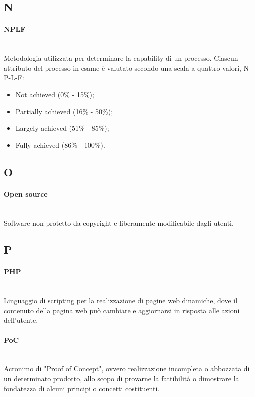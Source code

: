 \subsection*{N}
\paragraph{NPLF}~\smallskip \\
Metodologia utilizzata per determinare la capability di un processo. Ciascun attributo del processo in esame è valutato secondo una scala a quattro valori, N-P-L-F:
\begin{itemize}
	\item Not achieved (0\% - 15\%);
	\item Partially achieved (16\% - 50\%);
	\item Largely achieved (51\% - 85\%);
    \item Fully achieved (86\% - 100\%).
\end{itemize}
\newpage
{}
\subsection*{O}
\paragraph{Open source}~\smallskip \\
Software non protetto da copyright e liberamente modificabile dagli utenti.
\newpage
{}
\subsection*{P}
\paragraph{PHP}~\smallskip \\
Linguaggio di scripting per la realizzazione di pagine web dinamiche, dove il contenuto della pagina web può cambiare e aggiornarsi in risposta alle azioni dell'utente.

\paragraph{PoC}~\smallskip \\
Acronimo di "Proof of Concept", ovvero realizzazione incompleta o abbozzata di un determinato prodotto, allo scopo di provarne la fattibilità o dimostrare la fondatezza di alcuni principi o concetti costituenti.

